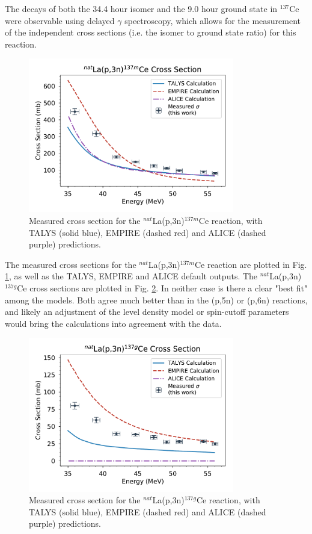 \documentclass[aps,superscriptaddress,twocolumn,secnumarabic,balancelastpage,amsmath,amssymb,nofootinbib,floatfix]{revtex4-1}
\begin{document}
The decays of both the 34.4 hour isomer and the 9.0 hour ground state in $^{137}$Ce were observable using delayed $\gamma$ spectroscopy, which allows for the measurement of the independent cross sections (i.e. the isomer to ground state ratio) for this reaction.  

\begin{figure}[htb]
\includegraphics[width=9cm]{cross_sections/137CEm}
\caption{Measured cross section for the $^{nat}$La(p,3n)$^{137m}$Ce reaction, with TALYS (solid blue), EMPIRE (dashed red) and ALICE (dashed purple) predictions.
}
\label{fig:137CEm}
\end{figure}

The measured cross sections for the $^{nat}$La(p,3n)$^{137m}$Ce reaction are plotted in Fig. \ref{fig:137CEm}, as well as the TALYS, EMPIRE and ALICE default outputs.  The $^{nat}$La(p,3n)$^{137g}$Ce cross sections are plotted in Fig. \ref{fig:137CEg}.  In neither case is there a clear "best fit" among the models.  Both agree much better than in the (p,5n) or (p,6n) reactions, and likely an adjustment of the level density model or spin-cutoff parameters would bring the calculations into agreement with the data.

\begin{figure}[htb]
\includegraphics[width=9cm]{cross_sections/137CEg}
\caption{Measured cross section for the $^{nat}$La(p,3n)$^{137g}$Ce reaction, with TALYS (solid blue), EMPIRE (dashed red) and ALICE (dashed purple) predictions.
}
\label{fig:137CEg}
\end{figure}
\end{document}
